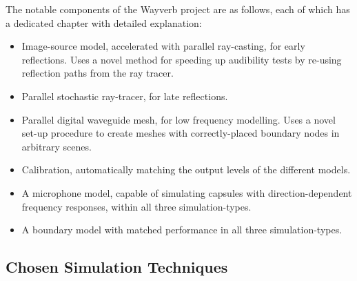 \documentclass[]{scrreprt}
\providecommand{\tightlist}{%
  \setlength{\itemsep}{0pt}\setlength{\parskip}{0pt}}
\begin{document}
The notable components of the Wayverb project are as follows, each of
which has a dedicated chapter with detailed explanation:

\begin{itemize}
\tightlist
\item
  Image-source model, accelerated with parallel ray-casting, for early
  reflections. Uses a novel method for speeding up audibility tests by
  re-using reflection paths from the ray tracer.
\item
  Parallel stochastic ray-tracer, for late reflections.
\item
  Parallel digital waveguide mesh, for low frequency modelling. Uses a
  novel set-up procedure to create meshes with correctly-placed boundary
  nodes in arbitrary scenes.
\item
  Calibration, automatically matching the output levels of the different
  models.
\item
  A microphone model, capable of simulating capsules with
  direction-dependent frequency responses, within all three
  simulation-types.
\item
  A boundary model with matched performance in all three
  simulation-types.
\end{itemize}

\subsection{Chosen Simulation
Techniques}\label{chosen-simulation-techniques}
\end{document}
